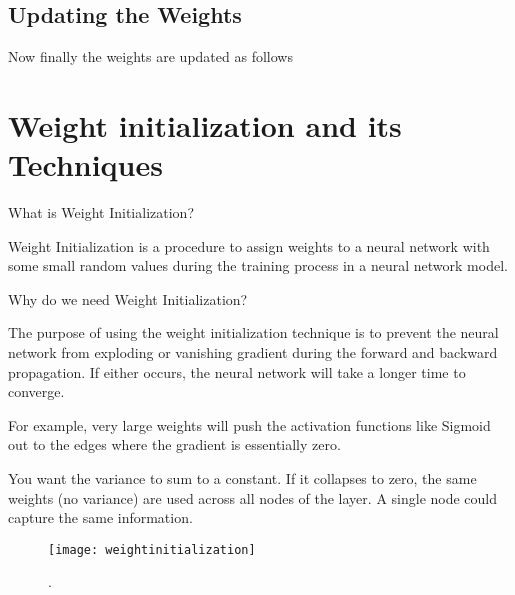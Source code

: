 	\subsection{Updating the Weights}
Now finally the weights are updated as follows

	\section{Weight initialization and its Techniques}

What is Weight Initialization?
	\begin{bulletedlist}
		\item Weight Initialization is a procedure to assign weights to a neural network with some small random values during the training process in a neural network model.
	\end{bulletedlist}

\vspace{\baselineskip}
\noindent Why do we need Weight Initialization?
	\begin{bulletedlist}
		\item The purpose of using the weight initialization technique is to prevent the neural network from exploding or vanishing gradient during the forward and
backward propagation. If either occurs, the neural network will take a longer time to converge.
		\item For example, very large weights will push the activation functions like Sigmoid out to the edges where the gradient is essentially zero.
		\item You want the variance to sum to a constant.  If it collapses to zero, the same weights (no variance) are used across all nodes of the layer.  A single node could capture the same information.
	\end{bulletedlist}


 	\begin{figure}[h]
		\centering
		\texttt{[image: weightinitialization]}
		\caption{.}
		\label{fig:weightinitialization}
	\end{figure}


